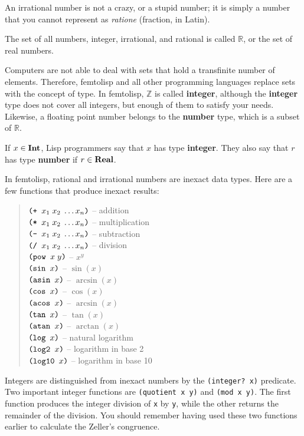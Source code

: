 \documentclass[a4paper,12pt]{book}
\begin{document}
An irrational number
is not a crazy, or a stupid number; it is simply a number that you cannot represent
as {\em ratione} (fraction, in Latin).

The set of all numbers, integer, 
irrational, and rational is called $\mathbb{R}$, or
the set of real numbers. 

Computers are not able to deal
with sets that hold a transfinite number of
elements. Therefore, femtolisp and
all other programming languages
replace sets with the concept of type.
In femtolisp, $\mathbb{Z}$ is 
called {\bf integer}, although
the {\bf integer} type does not cover all integers, 
but enough of them to satisfy
your needs. Likewise, a floating point
number belongs to the {\bf number} type, 
which is a subset of $\mathbb{R}$.


If $x\in{\bf Int}$, Lisp programmers say 
that $x$ has 
type\label{type:definition}  {\bf integer}. 
They also say that $r$ has 
type {\bf number} if $r\in {\bf Real}$.

In femtolisp, rational and irrational numbers
are inexact data types. Here are a few functions
that produce inexact results:
\begin{quote}
$\verb|(+ |x_1\;x_2\;\ldots x_n\verb|)|$ -- addition\\
$\verb|(* |x_1\;x_2\;\ldots x_n\verb|)|$ -- multiplication\\
$\verb|(- |x_1\;x_2\;\ldots x_n\verb|)|$ -- subtraction\\
$\verb|(/ |x_1\;x_2\;\ldots x_n\verb|)|$ -- division\\
$\verb|(pow |x\;y\verb|)|$ -- $x^y$\\
$\verb|(sin | x \verb|)|$ -- $\sin(x)$\\
$\verb|(asin | x \verb|)|$ -- $\arcsin(x)$\\
$\verb|(cos | x \verb|)|$ -- $\cos(x)$\\
$\verb|(acos | x \verb|)|$ -- $\arcsin(x)$\\ 
$\verb|(tan | x \verb|)|$ -- $\tan(x)$\\
$\verb|(atan | x \verb|)|$ -- $\arctan(x)$\\
$\verb|(log | x \verb|)|$ -- natural logarithm\\
$\verb|(log2 | x \verb|)|$ -- logarithm in base 2\\
$\verb|(log10 | x \verb|)|$ -- logarithm in base 10
\end{quote}
Integers are distinguished from inexact numbers
by the \verb|(integer? x)| predicate. Two important
integer functions are \verb|(quotient x y)| and
\verb|(mod x y)|. The first function
produces the integer division of \verb|x|
by \verb|y|, while the other returns
the remainder of the division. You should remember
having used
these two functions earlier to calculate the Zeller's
congruence.
\end{document}
